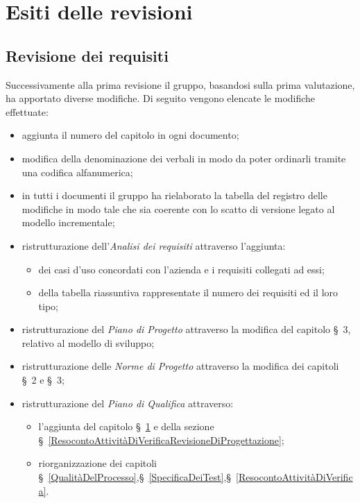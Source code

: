 \chapter{Esiti delle revisioni}\label{EsitiDelleRevisioni}

\section{Revisione dei requisiti}\label{EsitiDelleRevisioniRevisioneDeiRequisiti}

Successivamente alla prima revisione il gruppo, basandosi sulla prima valutazione, ha apportato diverse modifiche. Di seguito vengono elencate le modifiche effettuate:
\begin{itemize}
	\item aggiunta il numero del capitolo in ogni documento;
	\item modifica della denominazione dei verbali in modo da poter ordinarli tramite una codifica alfanumerica; 
	\item in tutti i documenti il gruppo ha rielaborato la tabella del registro delle modifiche in modo tale che sia coerente con lo scatto di versione legato al modello incrementale;
	\item ristrutturazione dell'\textit{Analisi dei requisiti} attraverso l'aggiunta: 
	\begin{itemize}
		\item dei casi d'uso concordati con l'azienda e i requisiti collegati ad essi;
		\item della tabella riassuntiva rappresentate il numero dei requisiti ed il loro tipo;
	\end{itemize}
	\item ristrutturazione del \textit{Piano di Progetto} attraverso la modifica del capitolo \S~3, relativo al modello di sviluppo;
	\item ristrutturazione delle \textit{Norme di Progetto} attraverso la modifica dei capitoli \S~2 e \S~3;
	\item ristrutturazione del \textit{Piano di Qualifica} attraverso:
	\begin{itemize}
		\item l'aggiunta del capitolo \S~\ref{EsitiDelleRevisioni} e della sezione \S~\ref{ResocontoAttivitàDiVerificaRevisioneDiProgettazione};%
		\item riorganizzazione dei capitoli \S~\ref{QualitàDelProcesso},\S~\ref{SpecificaDeiTest},\S~\ref{ResocontoAttivitàDiVerifica}.
	\end{itemize}
\end{itemize}


